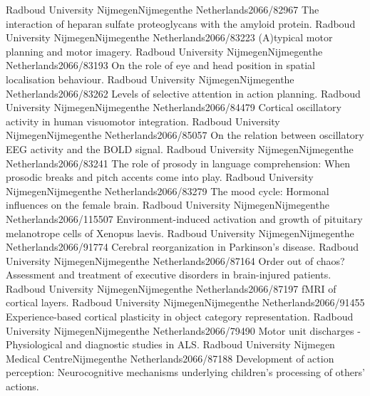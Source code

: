 	{Radboud University Nijmegen}{Nijmegen}{the Netherlands}{2066/82967}
	{The interaction of heparan sulfate proteoglycans with the amyloid protein.}
	{Radboud University Nijmegen}{Nijmegen}{the Netherlands}{2066/83223}
	{(A)typical motor planning and motor imagery.}
	{Radboud University Nijmegen}{Nijmegen}{the Netherlands}{2066/83193}
	{On the role of eye and head position in spatial localisation behaviour.}
	{Radboud University Nijmegen}{Nijmegen}{the Netherlands}{2066/83262}
	{Levels of selective attention in action planning.}
	{Radboud University Nijmegen}{Nijmegen}{the Netherlands}{2066/84479}
	{Cortical oscillatory activity in human visuomotor integration.}
	{Radboud University Nijmegen}{Nijmegen}{the Netherlands}{2066/85057}
	{On the relation between oscillatory EEG activity and the BOLD signal.}
	{Radboud University Nijmegen}{Nijmegen}{the Netherlands}{2066/83241}
	{The role of prosody in language comprehension: When prosodic breaks and pitch accents come into play.}
	{Radboud University Nijmegen}{Nijmegen}{the Netherlands}{2066/83279}
	{The mood cycle: Hormonal influences on the female brain.}
	{Radboud University Nijmegen}{Nijmegen}{the Netherlands}{2066/115507}
	{Environment-induced activation and growth of pituitary melanotrope cells of Xenopus laevis.}
	{Radboud University Nijmegen}{Nijmegen}{the Netherlands}{2066/91774}
	{Cerebral reorganization in Parkinson's disease.}
	{Radboud University Nijmegen}{Nijmegen}{the Netherlands}{2066/87164}
	{Order out of chaos? Assessment and treatment of executive disorders in brain-injured patients.}
	{Radboud University Nijmegen}{Nijmegen}{the Netherlands}{2066/87197}
	{fMRI of cortical layers.}
	{Radboud University Nijmegen}{Nijmegen}{the Netherlands}{2066/91455}
	{Experience-based cortical plasticity in object category representation.}
	{Radboud University Nijmegen}{Nijmegen}{the Netherlands}{2066/79490}
	{Motor unit discharges - Physiological and diagnostic studies in ALS.}
	{Radboud University Nijmegen Medical Centre}{Nijmegen}{the Netherlands}{2066/87188}
	{Development of action perception: Neurocognitive mechanisms underlying children's processing of others' actions.}
